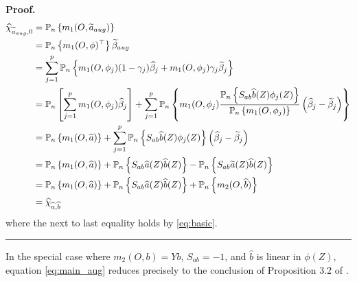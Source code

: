 \documentclass{article}
\newenvironment{proof}[1][Proof]{\noindent\textbf{#1.} }{\ \rule{0.5em}{0.5em}}
\begin{document}
\begin{proof}
\begin{align*}
\widehat{\chi }_{\widetilde{a}_{aug},0}& =\mathbb{P}_{n}\left\{ m_{1}(O,%
\widetilde{a}_{aug})\right\}  \\
& =\mathbb{P}_{n}\left\{ m_{1}(O,\phi )^{\top }\right\} \widetilde{\beta }%
_{aug} \\
& =\sum\limits_{j=1}^{p}\mathbb{P}_{n}\left\{ m_{1}(O,\phi _{j})(1-\gamma
_{j})\widehat{\beta }_{j}+m_{1}(O,\phi _{j})\gamma _{j}\widetilde{\beta }%
_{j}\right\}  \\
& =\mathbb{P}_{n}\left[ \sum\limits_{j=1}^{p}m_{1}(O,\phi _{j})\widehat{%
\beta }_{j}\right] +\sum\limits_{j=1}^{p}\mathbb{P}_{n}\left\{ m_{1}(O,\phi
_{j})\frac{\mathbb{P}_{n}\left\{ S_{ab}\widehat{b}(Z)\phi _{j}(Z)\right\} }{%
\mathbb{P}_{n}\left\{ m_{1}(O,\phi _{j})\right\} }\left( \widehat{\beta }%
_{j}-\widetilde{\beta }_{j}\right) \right\}  \\
& =\mathbb{P}_{n}\left\{ m_{1}(O,\widehat{a})\right\} +\sum\limits_{j=1}^{p}%
\mathbb{P}_{n}\left\{ S_{ab}\widehat{b}(Z)\phi _{j}(Z)\right\} \left( 
\widehat{\beta }_{j}-\widetilde{\beta }_{j}\right)  \\
& =\mathbb{P}_{n}\left\{ m_{1}(O,\widehat{a})\right\} +\mathbb{P}_{n}\left\{
S_{ab}\widehat{a}(Z)\widehat{b}(Z)\right\} -\mathbb{P}_{n}\left\{ S_{ab}%
\widetilde{a}(Z)\widehat{b}(Z)\right\}  \\
& =\mathbb{P}_{n}\left\{ m_{1}(O,\widehat{a})\right\} +\mathbb{P}_{n}\left\{
S_{ab}\widehat{a}(Z)\widehat{b}(Z)\right\} +\mathbb{P}_{n}\left\{ m_{2}(O,%
\widehat{b})\right\}  \\
& =\widehat{\chi }_{\widehat{a},\widehat{b}}
\end{align*}%
where the next to last equality holds by \eqref{eq:basic}.
\end{proof}

In the special case where $m_{2}(O,b)=Yb$, $S_{ab}=-1$, and $\widehat{b}$ is
linear in $\phi (Z)$, equation \eqref{eq:main_aug} reduces precisely to the
conclusion of Proposition 3.2 of \cite{bruns2025augmented}.
\end{document}
